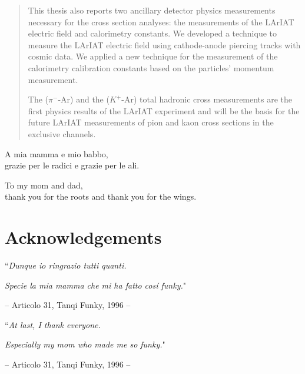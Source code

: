 \documentclass[letterpaper,12pt]{yalephd}
\newenvironment{dedication}
  {%
   \thispagestyle{empty}%
   \vspace*{\stretch{1}}%
   \itshape             %
   \raggedleft          %
  }
  {\par %
   \vspace{\stretch{3}} %
   \clearpage           %
  }
\begin{document}
\begin{abstract}
This thesis also reports two  ancillary  detector physics measurements necessary for the cross section analyses: the measurements of the LArIAT electric field and calorimetry constants. We developed a technique to measure the LArIAT electric field using cathode-anode piercing tracks with cosmic data. We applied a new technique for the measurement of the calorimetry calibration constants based on the particles' momentum measurement.


The ($\pi^-$-Ar) and the ($K^+$-Ar) total hadronic cross measurements are the first physics results of the LArIAT experiment and will be the basis for the future LArIAT measurements of pion and kaon cross sections in the exclusive channels.


\end{abstract}


\maketitle
{}

 \begin{dedication}
A mia mamma e mio babbo,\\
grazie per le radici e grazie per le ali.
    \par   %
    \vspace{2\baselineskip}
To my mom and dad,\\
thank you for the roots and thank you for the wings.
    \vspace{\baselineskip}
  \end{dedication}

\tableofcontents

\chapter{Acknowledgements} %

{\raggedleft ``\emph{Dunque io ringrazio tutti quanti.} \par}
{\raggedleft \emph{Specie la mia mamma che mi ha fatto cos\'i funky.}"\par}
{\raggedleft -- Articolo 31, Tanqi Funky, 1996 -- \par}
\vspace{0.5cm}

{\raggedleft ``\emph{At last, I thank everyone.} \par}
{\raggedleft \emph{Especially my mom who made me so funky.}"\par}
{\raggedleft -- Articolo 31, Tanqi Funky, 1996 -- \par}
\vspace{0.5cm}
\end{document}
